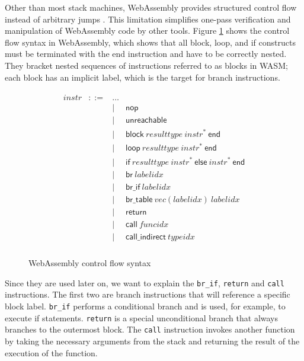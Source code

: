 Other than most stack machines, WebAssembly provides structured control flow instead of arbitrary jumps \autocite{noauthor_instructions_nodate}. This limitation simplifies one-pass verification and manipulation of WebAssembly code by other tools. Figure \ref{fig:control_flow} shows the control flow syntax in WebAssembly, which shows that all block, loop, and if constructs must be terminated with the end instruction and have to be correctly nested. They bracket nested sequences of instructions referred to as blocks in WASM; each block has an implicit label, which is the target for branch instructions.

\begin{figure}[h]
    \begin{equation}\nonumber
        \begin{split}
            \begin{array}{llcl}
                \mathit{instr} &::=&
                \dots \\&&|&
                \mathsf{nop} \\&&|&
                \mathsf{unreachable} \\&&|&
                \mathsf{block}~\mathit{resulttype}~\mathit{instr}^\ast~\mathsf{end} \\&&|&
                \mathsf{loop}~\mathit{resulttype}~\mathit{instr}^\ast~\mathsf{end} \\&&|&
                \mathsf{if}~\mathit{resulttype}~\mathit{instr}^\ast~\mathsf{else}~\mathit{instr}^\ast~\mathsf{end} \\&&|&
                \mathsf{br}~\mathit{labelidx} \\&&|&
                \mathsf{br\_if}~\mathit{labelidx} \\&&|&
                \mathsf{br\_table}~\mathit{vec}(\mathit{labelidx})~\mathit{labelidx} \\&&|&
                \mathsf{return} \\&&|&
                \mathsf{call}~\mathit{funcidx} \\&&|&
                \mathsf{call\_indirect}~\mathit{typeidx} \\
            \end{array}
        \end{split}
    \end{equation}
    \caption{WebAssembly control flow syntax}
    \label{fig:control_flow}
\end{figure}

Since they are used later on, we want to explain the \lstinline{br_if}, \lstinline{return} and \lstinline{call} instructions. The first two are branch instructions that will reference a specific block label. \lstinline{br_if} performs a conditional branch and is used, for example, to execute if statements. \lstinline{return} is a special unconditional branch that always branches to the outermost block. The \lstinline{call} instruction invokes another function by taking the necessary arguments from the stack and returning the result of the execution of the function.

